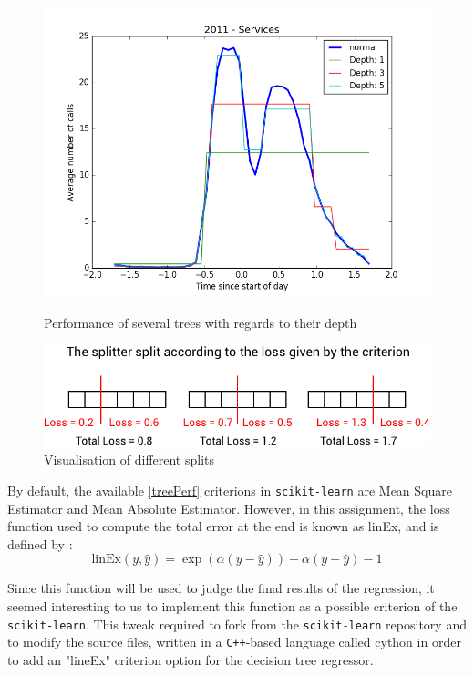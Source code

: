 \documentclass[a4paper,10pt]{article}
\begin{document}
  \begin{figure}[h]
    \begin{minipage}{0.48\textwidth}
      \centering
      \includegraphics[width=\textwidth]{graphics/1-TreeRegression.png}
      \caption{Performance of several trees with regards to their depth}
      \label{treePerf}
    \end{minipage}
    \hfill
    \begin{minipage}{0.48\textwidth}
      \centering
      \includegraphics[width=\textwidth]{graphics/splitterpng.png}
      \caption{Visualisation of different splits}
      \label{splitting}
    \end{minipage}
  \end{figure}
  By default, the available \ref{treePerf} criterions in {\tt scikit-learn} are Mean Square Estimator and Mean Absolute Estimator. However, in this assignment, the loss function used to compute the total error at the end is known as linEx, and is defined by :
  \begin{equation}
    \text{linEx}(y,\hat{y}) = \exp \left( \alpha (y-\hat{y})\right) - \alpha (y-\hat{y}) -1
  \end{equation}

  Since this function will be used to judge the final results of the regression, it seemed interesting to us to implement this function as a possible criterion of the {\tt scikit-learn}. This tweak required to fork from the {\tt scikit-learn} repository and to modify the source files, written in a {\tt C++}-based language called cython in order to add an "lineEx" criterion option for the decision tree regressor.
\end{document}
